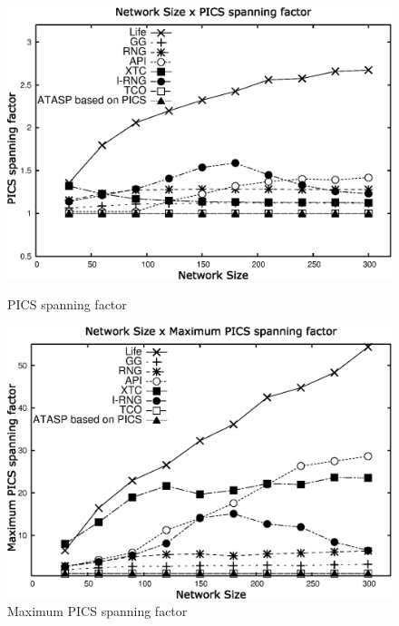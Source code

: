 \documentclass{llncs}
\begin{document}
\begin{figure}[ht]
\begin{minipage}[b]{0.46\linewidth}
\includegraphics[scale=0.35]{sigma_average}
\caption{PICS spanning factor}
\label{fig:sigma_interference}
\end{minipage}
\hspace{0.3cm}
\begin{minipage}[b]{0.46\linewidth}
\includegraphics[scale=0.35]{sigma_max}
\caption[]{Maximum PICS spanning factor}
\label{fig:max_sigma_interference}
\end{minipage}
\end{figure}
\end{document}

